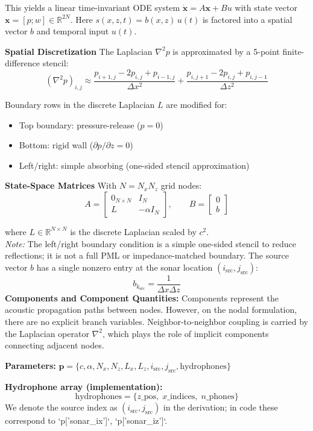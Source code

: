 \documentclass[11pt]{article}
\begin{document}
This yields a linear time-invariant ODE system $
\dot{\mathbf{x}} = A\mathbf{x} + B u$ with state vector $\mathbf{x} = [p; w] \in \mathbb{R}^{2N}$. Here $s(x,z,t) = b(x,z)\,u(t)$ is factored into a spatial vector $b$ and temporal input $u(t)$.

\textbf{Spatial Discretization} The Laplacian $\nabla^2 p$ is approximated by a 5-point finite-difference stencil:
\[
(\nabla^2 p)_{i,j} \approx
\frac{p_{i+1,j}-2p_{i,j}+p_{i-1,j}}{\Delta x^2} +
\frac{p_{i,j+1}-2p_{i,j}+p_{i,j-1}}{\Delta z^2}
\]

Boundary rows in the discrete Laplacian $L$ are modified for:
\begin{itemize}
    \item Top boundary: pressure-release ($p=0$)
    \item Bottom: rigid wall ($\partial p/\partial z=0$)
    \item Left/right: simple absorbing (one-sided stencil approximation)
\end{itemize}

\textbf{State-Space Matrices} With $N=N_x N_z$ grid nodes:
\[
A = 
\begin{bmatrix}
0_{N\times N} & I_{N} \\
L & -\alpha I_{N}
\end{bmatrix},
\qquad
B = \begin{bmatrix} 0 \\ b \end{bmatrix}
\]

where $L \in \mathbb{R}^{N\times N}$ is the discrete Laplacian scaled by $c^2$.  \\
\textit{Note:} The left/right boundary condition is a simple one-sided stencil to reduce reflections; it is not a full PML or impedance-matched boundary.
The source vector $b$ has a single nonzero entry at the sonar location $(i_\mathrm{src},j_\mathrm{src})$:
\[
b_{k_\mathrm{src}} = \frac{1}{\Delta x \Delta z}
\]
\textbf{Components and Component Quantities:} Components represent the acoustic propagation paths between nodes. However, on the nodal formulation, there are no explicit branch variables. Neighbor-to-neighbor coupling is carried by the Laplacian operator $\nabla^2$, which plays the role of implicit components connecting adjacent nodes.

\textbf{Parameters:}
$\mathbf{p} = \{c, \alpha, N_x, N_z, L_x, L_z, i_\mathrm{src}, j_\mathrm{src}, \text{hydrophones}\}\
$

\textbf{Hydrophone array (implementation):}
\[\text{hydrophones} = \{ z\_\mathrm{pos},\; x\_\mathrm{indices},\; n\_\mathrm{phones} \} \]
We denote the source index as $(i_\mathrm{src}, j_\mathrm{src})$ in the derivation; in code these correspond to `p['sonar_ix']`, `p['sonar_iz']`.
\end{document}
